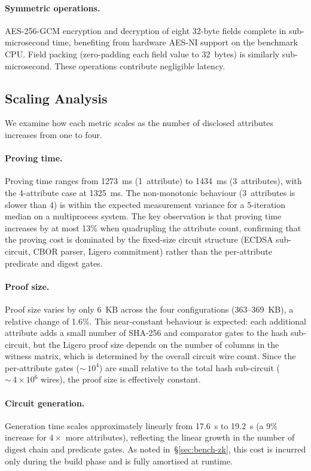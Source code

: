 \paragraph{Symmetric operations.}
AES-256-GCM encryption and decryption of eight 32-byte fields complete in sub-microsecond time, benefiting from hardware AES-NI support on the benchmark CPU.
Field packing (zero-padding each field value to 32~bytes) is similarly sub-microsecond.
These operations contribute negligible latency.

\subsection{Scaling Analysis}\label{sec:bench-scaling}

We examine how each metric scales as the number of disclosed attributes increases from one to four.

\paragraph{Proving time.}
Proving time ranges from 1273~ms (1~attribute) to 1434~ms (3~attributes), with the 4-attribute case at 1325~ms.
The non-monotonic behaviour (3~attributes is slower than 4) is within the expected measurement variance for a 5-iteration median on a multiprocess system.
The key observation is that proving time increases by at most 13\% when quadrupling the attribute count, confirming that the proving cost is dominated by the fixed-size circuit structure (ECDSA sub-circuit, CBOR parser, Ligero commitment) rather than the per-attribute predicate and digest gates.

\paragraph{Proof size.}
Proof size varies by only 6~KB across the four configurations (363--369~KB), a relative change of 1.6\%.
This near-constant behaviour is expected: each additional attribute adds a small number of SHA-256 and comparator gates to the hash sub-circuit, but the Ligero proof size depends on the number of columns in the witness matrix, which is determined by the overall circuit wire count.
Since the per-attribute gates (${\sim}\,10^4$) are small relative to the total hash sub-circuit (${\sim}\,4 \times 10^6$ wires), the proof size is effectively constant.

\paragraph{Circuit generation.}
Generation time scales approximately linearly from 17.6~s to 19.2~s (a 9\% increase for $4\times$ more attributes), reflecting the linear growth in the number of digest chain and predicate gates.
As noted in~\S\ref{sec:bench-zk}, this cost is incurred only during the build phase and is fully amortised at runtime.

